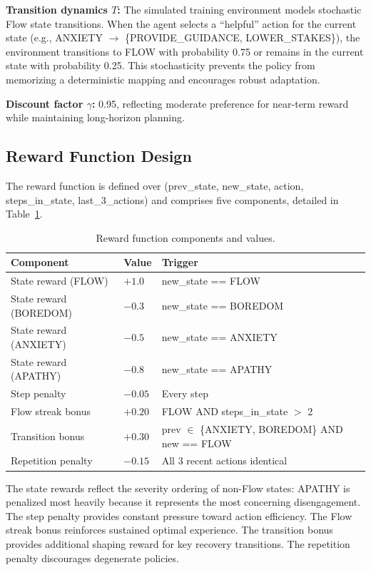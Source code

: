 \documentclass[12pt,a4paper]{report}
\begin{document}
\textbf{Transition dynamics $T$:} The simulated training environment models stochastic Flow state transitions. When the agent selects a ``helpful'' action for the current state (e.g., ANXIETY $\rightarrow$ \{PROVIDE\_GUIDANCE, LOWER\_STAKES\}), the environment transitions to FLOW with probability 0.75 or remains in the current state with probability 0.25. This stochasticity prevents the policy from memorizing a deterministic mapping and encourages robust adaptation.

\textbf{Discount factor $\gamma$:} 0.95, reflecting moderate preference for near-term reward while maintaining long-horizon planning.

\subsection{Reward Function Design}

The reward function is defined over (prev\_state, new\_state, action, steps\_in\_state, last\_3\_actions) and comprises five components, detailed in Table~\ref{tab:reward}.

\begin{table}[H]
\centering
\caption{Reward function components and values.}
\label{tab:reward}
\small
\begin{tabular}{@{}lll@{}}
\toprule
\textbf{Component} & \textbf{Value} & \textbf{Trigger} \\
\midrule
State reward (FLOW) & $+1.0$ & new\_state == FLOW \\
State reward (BOREDOM) & $-0.3$ & new\_state == BOREDOM \\
State reward (ANXIETY) & $-0.5$ & new\_state == ANXIETY \\
State reward (APATHY) & $-0.8$ & new\_state == APATHY \\
Step penalty & $-0.05$ & Every step \\
Flow streak bonus & $+0.20$ & FLOW AND steps\_in\_state $>$ 2 \\
Transition bonus & $+0.30$ & prev $\in$ \{ANXIETY, BOREDOM\} AND new == FLOW \\
Repetition penalty & $-0.15$ & All 3 recent actions identical \\
\bottomrule
\end{tabular}
\end{table}

The state rewards reflect the severity ordering of non-Flow states: APATHY is penalized most heavily because it represents the most concerning disengagement. The step penalty provides constant pressure toward action efficiency. The Flow streak bonus reinforces sustained optimal experience. The transition bonus provides additional shaping reward for key recovery transitions. The repetition penalty discourages degenerate policies.
\end{document}

